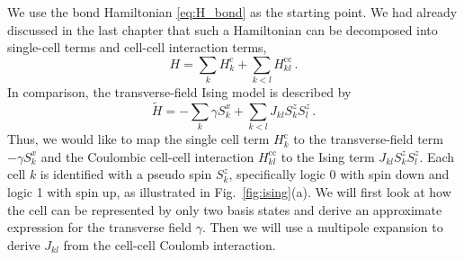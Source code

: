 We use the bond Hamiltonian \eqref{eq:H_bond} as the starting point. We had
already discussed in the last chapter that such a Hamiltonian can be decomposed
into single-cell terms and cell-cell interaction terms,
\begin{equation}
  H = \sum_k H^\text{c}_k + \sum_{k<l} H^\text{cc}_{kl} \, .
\end{equation}
In comparison, the transverse-field Ising model is described by
%
\begin{equation}
  \tilde{H} = - \sum_k \gamma S^x_k + \sum_{k<l} J_{kl} S^z_k S^z_l \, .
\end{equation}
%
Thus, we would like to map the single cell term $H^\text{c}_k$ to the transverse-field
term $-\gamma S^x_k$ and the Coulombic cell-cell interaction $H^\text{cc}_{kl}$ to
the Ising term $J_{kl} S^z_k S^z_l$. Each cell $k$ is identified with a pseudo
spin $S^z_k$, specifically logic 0 with spin down and logic 1 with spin up, as
illustrated in Fig.~\ref{fig:ising}(a). We will first look at how the 
cell can be represented by only two basis states and derive an approximate
expression for the transverse field $\gamma$. Then we will use a multipole
expansion to derive $J_{kl}$ from the cell-cell Coulomb interaction.

